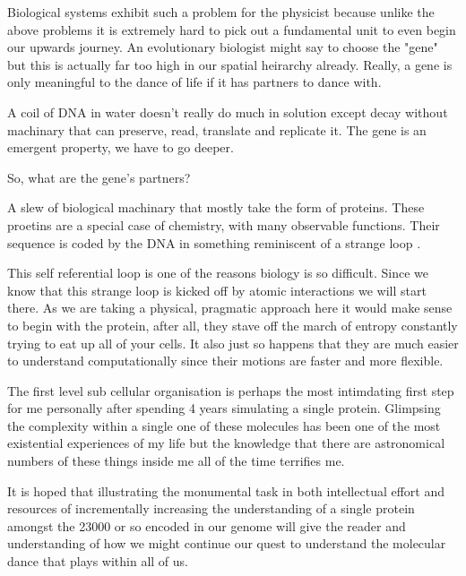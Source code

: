 Biological systems exhibit such a problem for the physicist because unlike the above problems it is extremely hard to pick out a fundamental unit to even begin our upwards journey. An evolutionary biologist might say to choose the "gene" but this is actually far too high in our spatial heirarchy already. Really, a gene is only meaningful to the dance of life if it has partners to dance with. 

A coil of DNA in water doesn't really do much in solution except decay without machinary that can preserve, read, translate and replicate it. The gene is an emergent property, we have to go deeper. 

So, what are the gene's partners? 

A slew of biological machinary that mostly take the form of proteins. These proetins are a special case of chemistry, with many observable functions. Their sequence is  coded by the DNA in something reminiscent of a strange loop \cite{hofstadter2007}. 

This self referential loop is one of the reasons biology is so difficult. Since we know that this strange loop is kicked off by atomic interactions we will start there. As we are taking a physical, pragmatic approach here it would make sense to begin with the protein, after all, they stave off the march of entropy constantly trying to eat up all of your cells. It also just so happens that they are much easier to understand computationally since their motions are faster and more flexible. 

The first level sub cellular organisation is perhaps the most intimdating first step for me personally after spending 4 years simulating a single protein. Glimpsing the complexity within a single one of these molecules has been one of the most existential experiences of my life but the knowledge that there are astronomical numbers of these things inside me all of the time terrifies me.

It is hoped that illustrating the monumental task in both intellectual effort and resources of incrementally increasing the understanding of a single protein amongst the 23000 or so encoded in our genome will give the reader and understanding of how we might continue our quest to understand the molecular dance that plays within all of us.  
 

